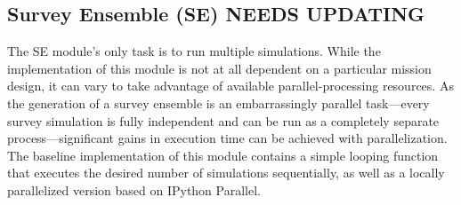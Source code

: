 \documentclass[cleanfoot]{asme2ej}
\begin{document}

\subsection{Survey Ensemble (SE) NEEDS UPDATING}
The SE module's only task is to run multiple simulations.  While the implementation of this module is not at all dependent on a particular mission design, it can vary to take advantage of available parallel-processing resources.  As the generation of a survey ensemble is an embarrassingly parallel task---every survey simulation is fully independent and can be run as a completely separate process---significant gains in execution time can be achieved with parallelization.  The baseline implementation of this module contains a simple looping function that executes the desired number of simulations sequentially, as well as a locally parallelized version based on IPython Parallel.
\end{document}

